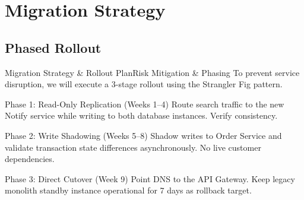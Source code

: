 \section{Migration Strategy}
\subsection{Phased Rollout}

\begin{frame}{Migration Strategy \& Rollout Plan}{Risk Mitigation \& Phasing}
  To prevent service disruption, we will execute a 3-stage rollout using the Strangler Fig pattern.
  
  \vspace{0.08cm}
  \begin{minipage}{\textwidth}
    \begin{statbox}{Phase 1: Read-Only Replication (Weeks 1--4)}
      Route search traffic to the new Notify service while writing to both database instances. Verify consistency.
    \end{statbox}
  \end{minipage}
  
  \par\vspace{0.04cm}
  
  \begin{minipage}{\textwidth}
    \begin{warningbox}{Phase 2: Write Shadowing (Weeks 5--8)}
      Shadow writes to Order Service and validate transaction state differences asynchronously. No live customer dependencies.
    \end{warningbox}
  \end{minipage}

  \par\vspace{0.04cm}

  \begin{minipage}{\textwidth}
    \begin{successbox}{Phase 3: Direct Cutover (Week 9)}
      Point DNS to the API Gateway. Keep legacy monolith standby instance operational for 7 days as rollback target.
    \end{successbox}
  \end{minipage}
\end{frame}
